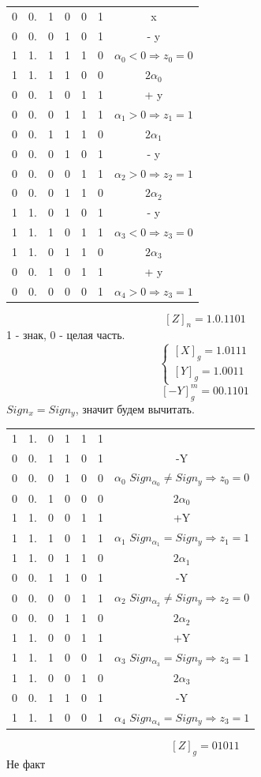 \documentclass[12px]{article}
\begin{document}
\begin{tabular}{c c c c c c c}
	0&0.&1&0&0&1& x\\
	0&0.&0&1&0&1& - y\\
	\hline 
	1&1.&1&1&1&0& $\alpha_0 < 0 \Rightarrow z_0 = 0$\\
	1&1.&1&1&0&0& $2\alpha_0$\\
	0&0.&1&0&1&1& + y\\
	\hline 
	0&0.&0&1&1&1& $\alpha_1 > 0 \Rightarrow z_1 = 1$\\
	0&0.&1&1&1&0& $2\alpha_1$\\
	0&0.&0&1&0&1& - y\\
	\hline 
	0&0.&0&0&1&1& $\alpha_2 > 0 \Rightarrow z_2 = 1$\\
	0&0.&0&1&1&0& $2\alpha_2$\\
	1&1.&0&1&0&1& - y\\
	\hline 
	1&1.&1&0&1&1& $\alpha_3 < 0 \Rightarrow z_3 = 0$\\
	1&1.&0&1&1&0& $2\alpha_3$\\
	0&0.&1&0&1&1& + y\\
	\hline 
	0&0.&0&0&0&1& $\alpha_4 > 0 \Rightarrow z_3 = 1$\\
\end{tabular}
\[ [Z]_n = 1.0.1101\]
1 - знак, 0 - целая часть. 
\[ \begin{cases}
	[X]_g = 1.0111 \\
	[Y]_g = 1.0011
\end{cases} \] 
\[ [-Y]_g^m = 00.1101 \]
$ Sign_x = Sign_y$, значит будем вычитать. \\
\begin{tabular}{c c c c c c c}
	1&1.&0&1&1&1& \\
	0&0.&1&1&0&1& -Y\\
	\hline 
	0&0.&0&1&0&0& $\alpha_0$  $Sign_{\alpha_0}\not= Sign_y \Rightarrow z_0 = 0$\\
	0&0.&1&0&0&0& $2\alpha_0$\\
	1&1.&0&0&1&1& +Y\\
	\hline 
	1&1.&1&0&1&1& $\alpha_1$  $Sign_{\alpha_1}= Sign_y \Rightarrow z_1 = 1$\\
	1&1.&0&1&1&0& $2\alpha_1$\\
	0&0.&1&1&0&1& -Y\\
	\hline 
	0&0.&0&0&1&1& $\alpha_2$  $Sign_{\alpha_2}\not= Sign_y \Rightarrow z_2 = 0$\\
	0&0.&0&1&1&0& $2\alpha_2$\\
	1&1.&0&0&1&1& +Y\\
	\hline 
	1&1.&1&0&0&1& $\alpha_3$  $Sign_{\alpha_3}= Sign_y \Rightarrow z_3 = 1$\\
	1&1.&0&0&1&0& $2\alpha_3$\\
	0&0.&1&1&0&1& -Y\\
	\hline 
	1&1.&1&0&0&1& $\alpha_4$  $Sign_{\alpha_4} = Sign_y \Rightarrow z_3 = 1$\\
\end{tabular}
\[ [Z]_g = 01011 \]
Не факт
\end{document}
